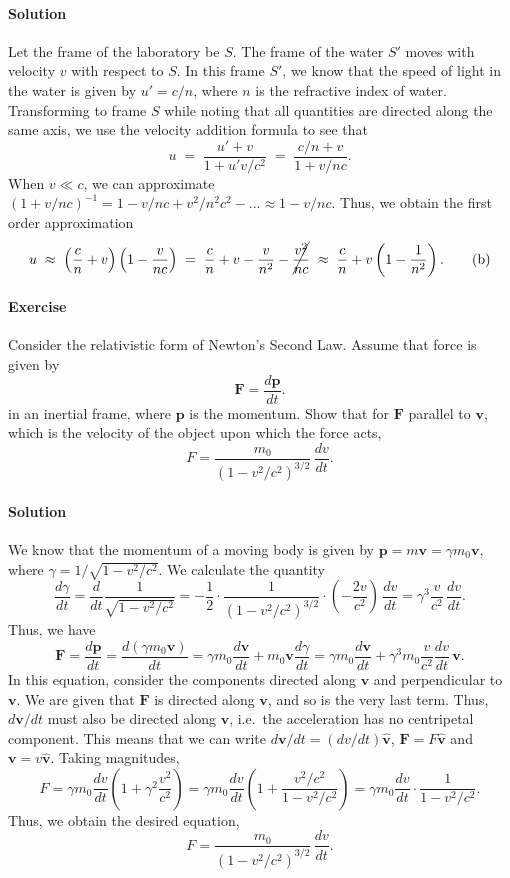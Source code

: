 \documentclass[10pt]{article}
\let\vec\boldsymbol
\newcommand\dd[2]{\frac{d #1}{d #2}}
\renewcommand\v{\vec{v}}
\newcounter{prob}
\def\problem{\stepcounter{prob}\paragraph{Exercise \arabic{prob}}}
\def\solution{\paragraph{Solution}}
\begin{document}
        \solution Let the frame of the laboratory be $S$. The frame of the water $S'$ moves with velocity $v$ with respect to $S$.
        In this frame $S'$, we know that the speed of light in the water is given by $u' = c / n$, where $n$ is the refractive index of water.
        Transforming to frame $S$ while noting that all quantities are directed along the same axis, we use the velocity addition formula to see that
        \[
                u \;=\; \frac{u' + v}{1 + u'v/c^2} \;=\; \frac{c/n + v}{1 + v/nc}. \tag{a}
        \]
        When $v \ll c$, we can approximate $(1 + v/nc)^{-1} = 1 - v/nc + v^2 /n^2c^2 - \dots \approx 1 - v/nc$.
        Thus, we obtain the first order approximation
        \[
                u \;\approx\; \left(\frac{c}{n} + v\right)\left(1 - \frac{v}{nc}\right) \;=\; \frac{c}{n} + v - \frac{v}{n^2} - \cancel{\frac{v^2}{nc}}
                        \;\approx\; \frac{c}{n} + v\left(1 - \frac{1}{n^2}\right). \tag{b}
        \]

        \problem Consider the relativistic form of Newton's Second Law. Assume that force is given by
        \[
                \vec{F} = \dd{\vec{p}}{t}.
        \]
        in an inertial frame, where $\vec{p}$ is the momentum. Show that for $\vec{F}$ parallel to $\v$, which is the velocity of the object upon which
        the force acts,
        \[
                F = \frac{m_0}{(1 - v^2 /c^2)^{3 /2}}\,\dd{v}{t}.
        \]

        \solution We know that the momentum of a moving body is given by $\vec{p} = m\v = \gamma m_0\v$, where $\gamma = 1 /\sqrt{1 - v^2 /c^2}$.
        We calculate the quantity
        \[
                \dd{\gamma}{t} = \dd{}{t}\frac{1}{\sqrt{1 - v^2 /c^2}} = -\frac{1}{2}\cdot\frac{1}{(1 - v^2 /c^2)^{3 /2}}\cdot 
                        \left(-\frac{2v}{c^2}\right)\,\dd{v}{t} = \gamma^3 \frac{v}{c^2}\, \dd{v}{t}.
        \]
        Thus, we have
        \[
                \vec{F} = \dd{\vec{p}}{t} = \dd{(\gamma m_0\v)}{t} = \gamma m_0 \dd{\v}{t} + m_0\v\dd{\gamma}{t} = 
                        \gamma m_0 \dd{\v}{t} + \gamma^3 m_0 \frac{v}{c^2}\dd{v}{t}\,\v.
        \]
        In this equation, consider the components directed along $\v$ and perpendicular to $\v$. We are given that $\vec{F}$ is 
        directed along $\v$, and so is the very last term. Thus, $d\v/dt$ must also be directed along $\v$, i.e.\ the acceleration has no
        centripetal component. This means that we can write $d\v /dt = (dv/dt)\hat{\vec{v}}$, $\vec{F} = F\hat{\vec{v}}$
        and $\v = v\hat{\vec{v}}$. Taking magnitudes,
        \[
                F = \gamma m_0 \dd{v}{t}\left(1 + \gamma^2\frac{v^2}{c^2}\right) =
                        \gamma m_0 \dd{v}{t}\left(1 + \frac{v^2 /c^2}{1 - v^2 /c^2}\right) =
                        \gamma m_0 \dd{v}{t}\cdot \frac{1}{1 - v^2 /c^2}.
        \]
        Thus, we obtain the desired equation,
        \[
                F = \frac{m_0}{(1 - v^2 /c^2)^{3 /2}}\,\dd{v}{t}.
        \]
\end{document}
